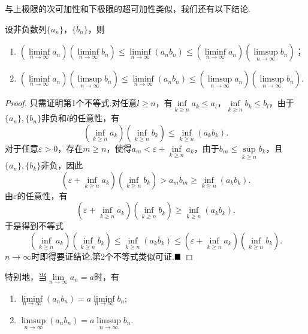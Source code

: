 与上极限的次可加性和下极限的超可加性类似，我们还有以下结论.
\begin{theorem}
	设非负数列$\{a_n\}$，$\{b_n\}$，则
	\begin{enumerate}
		\item $\left(\liminf\limits_{n \to \infty}a_n\right)\left(\liminf\limits_{n \to \infty}b_n\right)\leqslant\liminf\limits_{n \to \infty}\left(a_nb_n\right)\leqslant\left(\liminf\limits_{n \to \infty}a_n\right)\left(\limsup\limits_{n \to \infty}b_n\right)$；
		\item $\left(\liminf\limits_{n \to \infty}a_n\right)\left(\limsup\limits_{n \to \infty}b_n\right)\leqslant\liminf\limits_{n \to \infty}\left(a_nb_n\right)\leqslant\left(\limsup\limits_{n \to \infty}a_n\right)\left(\limsup\limits_{n \to \infty}b_n\right)$.
	\end{enumerate}
\end{theorem}
\begin{proof}
	只需证明第1个不等式.对任意$l\geqslant n$，有$\inf\limits_{k\geqslant n}a_k\leqslant a_l$，$\inf\limits_{k\geqslant n}b_k\leqslant b_l$，由于$\{a_n\},\{b_n\}$非负和$l$的任意性，有
	$$\left(\inf\limits_{k\geqslant n}a_k\right)\left(\inf\limits_{k\geqslant n}b_k\right)\leqslant\inf\limits_{k\geqslant n}(a_kb_k).$$
	对于任意$\varepsilon>0$，存在$m\geqslant n$，使得$a_m<\varepsilon+\inf\limits_{k\geqslant n}a_k$，由于$b_m\leqslant\sup\limits_{k\geqslant n}b_k$，且$\{a_n\},\{b_k\}$非负，因此
	$$\left(\varepsilon+\inf\limits_{k\geqslant n}a_k\right)\left(\inf\limits_{k\geqslant n}b_k\right)> a_mb_m\geqslant \inf\limits_{k\geqslant n}(a_kb_k).$$
	由$\varepsilon$的任意性，有
	$$\left(\varepsilon+\inf\limits_{k\geqslant n}a_k\right)\left(\inf\limits_{k\geqslant n}b_k\right)\geqslant \inf\limits_{k\geqslant n}(a_kb_k).$$
	于是得到不等式
	$$\left(\inf\limits_{k\geqslant n}a_k\right)\left(\inf\limits_{k\geqslant n}b_k\right)\leqslant\inf\limits_{k\geqslant n}(a_kb_k)\leqslant\left(\varepsilon+\inf\limits_{k\geqslant n}a_k\right)\left(\inf\limits_{k\geqslant n}b_k\right).$$
	$n\to\infty$时即得要证结论.第2个不等式类似可证.$\hfill\blacksquare$
\end{proof}
\begin{remark}
	特别地，当$\lim\limits_{n\to\infty}a_n=a$时，有
	\begin{enumerate}
		\item $\liminf\limits_{n\to\infty}(a_nb_n)=a\liminf\limits_{n \to \infty}b_n$;
		\item $\limsup\limits_{n\to\infty}(a_nb_n)=a\limsup\limits_{n \to \infty}b_n$.
	\end{enumerate}
\end{remark}









